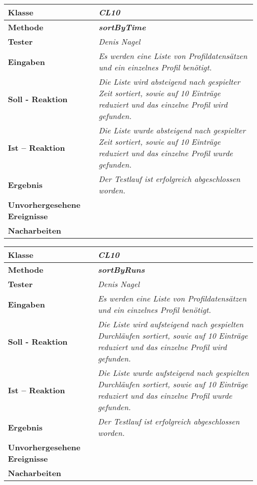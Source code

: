 \begin{longtable}{|p{4cm}|p{11cm}|}
\hline
\textbf{Klasse} & \textit{\textbf{CL10}} \\
\hline
\textbf{Methode} & \textit{\textbf{sortByTime}} \\
\hline
\textbf{Tester} & \textit{Denis Nagel} \\
\hline
\textbf{Eingaben} & \textit{Es werden eine Liste von Profildatensätzen und ein einzelnes Profil benötigt.} \\
\hline
\textbf{Soll - Reaktion} & \textit{Die Liste wird absteigend nach gespielter Zeit sortiert, sowie auf 10 Einträge reduziert und das einzelne Profil wird gefunden.} \\
\hline
\textbf{Ist -- Reaktion} & \textit{Die Liste wurde absteigend nach gespielter Zeit sortiert, sowie auf 10 Einträge reduziert und das einzelne Profil wurde gefunden.} \\
\hline
\textbf{Ergebnis} & \textit{Der Testlauf ist erfolgreich abgeschlossen worden.} \\
\hline
\textbf{Unvorhergesehene Ereignisse} &
\textit{} \\
\hline
\textbf{Nacharbeiten } & \textit{} \\
\hline
\end{longtable}

\begin{longtable}{|p{4cm}|p{11cm}|}
\hline
\textbf{Klasse} & \textit{\textbf{CL10}} \\
\hline
\textbf{Methode} & \textit{\textbf{sortByRuns}} \\
\hline
\textbf{Tester} & \textit{Denis Nagel} \\
\hline
\textbf{Eingaben} & \textit{Es werden eine Liste von Profildatensätzen und ein einzelnes Profil benötigt.} \\
\hline
\textbf{Soll - Reaktion} & \textit{Die Liste wird aufsteigend nach gespielten Durchläufen sortiert, sowie auf 10 Einträge reduziert und das einzelne Profil wird gefunden.} \\
\hline
\textbf{Ist -- Reaktion} & \textit{Die Liste wurde aufsteigend nach gespielten Durchläufen sortiert, sowie auf 10 Einträge reduziert und das einzelne Profil wurde gefunden.} \\
\hline
\textbf{Ergebnis} & \textit{Der Testlauf ist erfolgreich abgeschlossen worden.} \\
\hline
\textbf{Unvorhergesehene Ereignisse} &
\textit{} \\
\hline
\textbf{Nacharbeiten } & \textit{} \\
\hline
\end{longtable}

